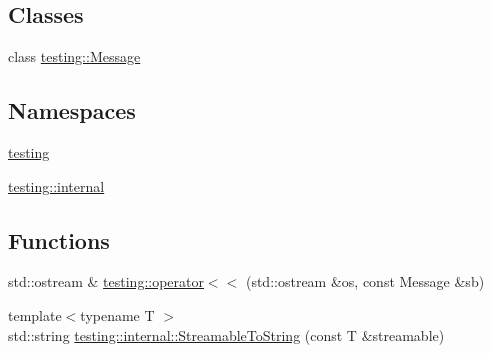 \subsection*{Classes}
\begin{DoxyCompactItemize}
\item 
class \hyperlink{classtesting_1_1Message}{testing\+::\+Message}
\end{DoxyCompactItemize}
\subsection*{Namespaces}
\begin{DoxyCompactItemize}
\item 
 \hyperlink{namespacetesting}{testing}
\item 
 \hyperlink{namespacetesting_1_1internal}{testing\+::internal}
\end{DoxyCompactItemize}
\subsection*{Functions}
\begin{DoxyCompactItemize}
\item 
std\+::ostream \& \hyperlink{namespacetesting_a7b802e532fd68749765cb7dc156130db}{testing\+::operator$<$$<$} (std\+::ostream \&os, const Message \&sb)
\item 
{\footnotesize template$<$typename T $>$ }\\std\+::string \hyperlink{namespacetesting_1_1internal_aad4beed95d0846e6ffc5da0978ef3bb9}{testing\+::internal\+::\+Streamable\+To\+String} (const T \&streamable)
\end{DoxyCompactItemize}
